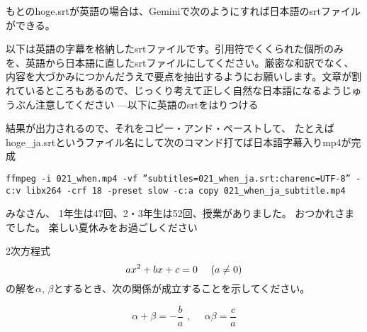 \documentclass[12pt,jafontscale=0.9247]{jlreq}
\begin{document}
もとのhoge.srtが英語の場合は、Geminiで次のようにすれば日本語のsrtファイルができる。
\begin{tcolorbox}
 以下は英語の字幕を格納したsrtファイルです。引用符でくくられた個所のみを、英語から日本語に直したsrtファイルにしてください。厳密な和訳でなく、内容を大づかみにつかんだうえで要点を抽出するようにお願いします。文章が割れているところもあるので、じっくり考えて正しく自然な日本語になるようじゅうぶん注意してください
---以下に英語のsrtをはりつける
\end{tcolorbox}

結果が出力されるので、それをコピー・アンド・ペーストして、
たとえばhoge\_ja.srtというファイル名にして次のコマンド打てば日本語字幕入りmp4が完成

\begin{verbatim}
ffmpeg -i 021_when.mp4 -vf ”subtitles=021_when_ja.srt:charenc=UTF-8” -c:v libx264 -crf 18 -preset slow -c:a copy 021_when_ja_subtitle.mp4
\end{verbatim}

\newpage
\vfill

{\gtfamily\bfseries

みなさん、
1年生は47回、2・3年生は52回、授業がありました。
おつかれさまでした。
楽しい夏休みをお過ごしください
}

%


2次方程式
\[
 ax^2+bx+c=0\,\,\,\,\,\,\,\,\text(a\neq{}0\text)
\]
の解を$\alpha$, $\beta$とするとき、次の関係が成立することを示してください。

\begin{tcolorbox}
 \[
 \alpha + \beta = -\frac{b}{a}\,\,,\,\,\,\,\,\,\,\,\alpha\beta = \frac{c}{a}
\]

\end{tcolorbox}
\end{document}

